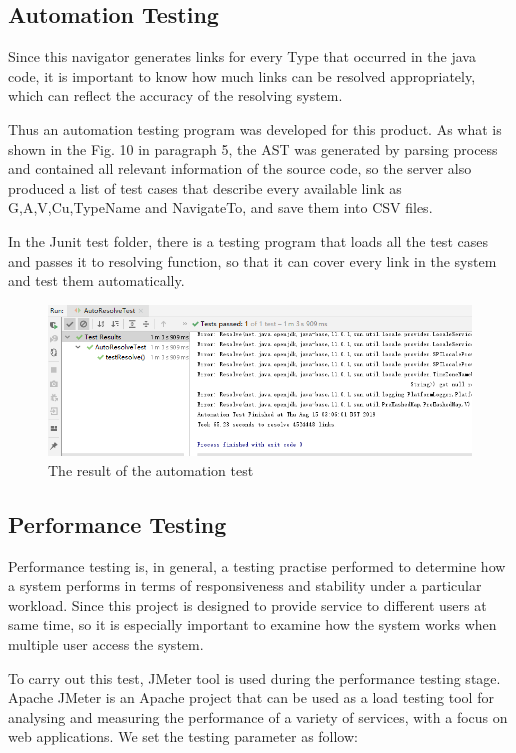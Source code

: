 \documentclass[runningheads]{llncs}
\begin{document}
\subsection{Automation Testing}
Since this navigator generates links for every Type that occurred in the java code, it is important to know how much links can be resolved appropriately, which can reflect the accuracy of the resolving system.

Thus an automation testing program was developed for this product. As what is shown in the Fig. 10 in paragraph 5, the AST was generated by parsing process and contained all relevant information of the source code, so the server also produced a list of test cases that describe every available link as G,A,V,Cu,TypeName and NavigateTo, and save them into CSV files.

In the Junit test folder, there is a testing program that loads all the test cases and passes it to resolving function, so that it can cover every link in the system and test them automatically.


\begin{figure}[H]
	\centering
	\includegraphics[width=12cm]{pic/automation-test.png}
	\caption{The result of the automation test}
	\label{The result of the automation test}
\end{figure}

\subsection{Performance Testing}
Performance testing is, in general, a testing practise performed to determine how a system performs in terms of responsiveness and stability under a particular workload.\cite{performance_testing} Since this project is designed to provide service to different users at same time, so it is especially important to examine how the system works when multiple user access the system.

To carry out this test, JMeter\cite{halili2008jemeter} tool is used during the performance testing stage. Apache JMeter is an Apache project that can be used as a load testing tool for analysing and measuring the performance of a variety of services, with a focus on web applications.\cite{Apache_JMeter} We set the testing parameter as follow:
\end{document}
